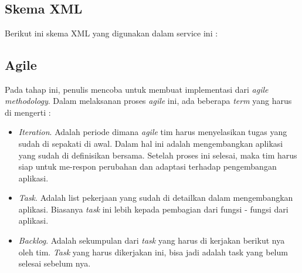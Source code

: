 \documentclass[9pt,twocolumn,twoside]{Gunadarma}
\begin{document}
\\ \\ \\ \\ \\ \\ \\ \\ \\ \\ \\ 

\subsection{Skema XML}
Berikut ini skema XML yang digunakan dalam service ini :
\begin{table}[htbp]
\centering
\small
\caption{\bf Skema \textit{Payment}}
  \label{tab:Skema Payment}
\end{table}


\subsection{Agile}
Pada tahap ini, penulis mencoba untuk membuat implementasi dari \textit{agile methodology}. Dalam melaksanan proses \textit{agile} ini, ada beberapa \textit{term} yang harus di mengerti :
\begin{itemize}
\item \textit{Iteration}. Adalah periode dimana \textit{agile} tim harus menyelasikan tugas yang sudah di sepakati di awal. Dalam hal ini adalah mengembangkan aplikasi yang sudah di definisikan bersama. Setelah proses ini selesai, maka tim harus siap untuk me-respon perubahan dan adaptasi terhadap pengembangan aplikasi.
\item \textit{Task}. Adalah list pekerjaan yang sudah di detailkan dalam mengembangkan aplikasi. Biasanya \textit{task} ini lebih kepada pembagian dari fungsi - fungsi dari aplikasi.
\item \textit{Backlog}. Adalah sekumpulan dari \textit{task} yang harus di kerjakan berikut nya oleh tim. \textit{Task} yang harus dikerjakan ini, bisa jadi adalah task yang belum selesai sebelum nya. 
\end{itemize}
\end{document}
